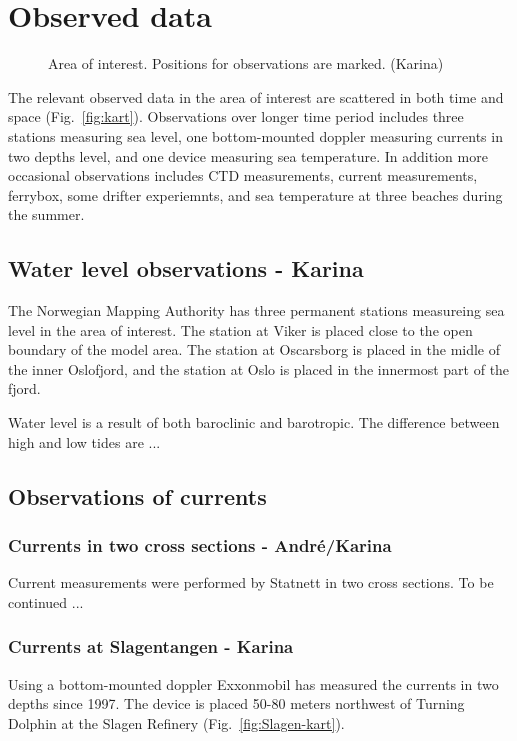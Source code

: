 \documentclass[12pt,a4paper,english]{article}
\begin{document}
\newpage
\section{Observed data}

\begin{figure}[htb]
\centerline{
}
\caption{\small
Area of interest. Positions for observations are marked. (Karina)
}
\label{fig:kart_obs}
\end{figure}

The relevant observed data in the area of interest are scattered in both time and space (Fig.~\ref{fig:kart}). Observations over longer time period includes three stations measuring sea level, one bottom-mounted doppler measuring currents in two depths level, and one device measuring sea temperature. In addition more occasional observations includes CTD measurements, current measurements, ferrybox, some drifter experiemnts, and sea temperature at three beaches during the summer.  

\subsection{Water level observations - Karina}
The Norwegian Mapping Authority has three permanent stations measureing sea level in the area of interest. The station at Viker is placed close to the open boundary of the model area. The station at Oscarsborg is placed in the midle of the inner Oslofjord, and the station at Oslo is placed in the innermost part of the fjord.

Water level is a result of both baroclinic and barotropic. The difference between high and low tides are ...	

\subsection{Observations of currents}

\subsubsection{Currents in two cross sections - Andr\'{e}/Karina}
Current measurements were performed by Statnett in two cross sections. To be continued ...


\subsubsection{Currents at Slagentangen - Karina}
Using a bottom-mounted doppler Exxonmobil has measured the currents in two depths since 1997. The device is placed 50-80 meters northwest of Turning Dolphin at the Slagen Refinery (Fig.~\ref{fig:Slagen-kart}). 
\end{document}
